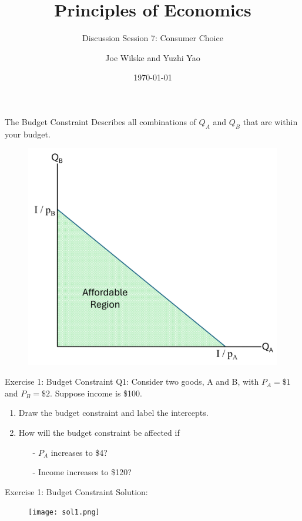 \documentclass[9pt, handout]{beamer}
\title{Principles of Economics}
\subtitle{Discussion Session 7: Consumer Choice}
\author{Joe Wilske and Yuzhi Yao}
\institute{Boston College}
\date{\today}
\begin{document}
\frame{\titlepage}

\begin{frame}{The Budget Constraint}
    Describes all combinations of $Q_A$ and $Q_B$ that are within your budget.
    \begin{figure}
        \centering
        \includegraphics[width=0.65\linewidth]{budget_region.png}
    \end{figure}
\end{frame}

\begin{frame}{Exercise 1: Budget Constraint}
    Q1: Consider two goods, A and B, with $P_A=\$1$ and $P_B=\$2$. Suppose income is \$100. 
    \vspace{7pt}
    \begin{enumerate}
        \item Draw the budget constraint and label the intercepts.
        \vspace{7pt}
        \item How will the budget constraint be affected if 
        \vspace{5pt}
        \begin{itemize}
            \item[-] $P_A$ increases to \$4?
            \vspace{5pt}
            \item[-] Income increases to \$120?
        \end{itemize}
    \end{enumerate}
    \vspace{1.5in}
\end{frame}

\begin{frame}{Exercise 1: Budget Constraint}
    Solution: 
    \begin{figure}
        \centering
        \texttt{[image: sol1.png]}
    \end{figure}
\end{frame}
\end{document}
